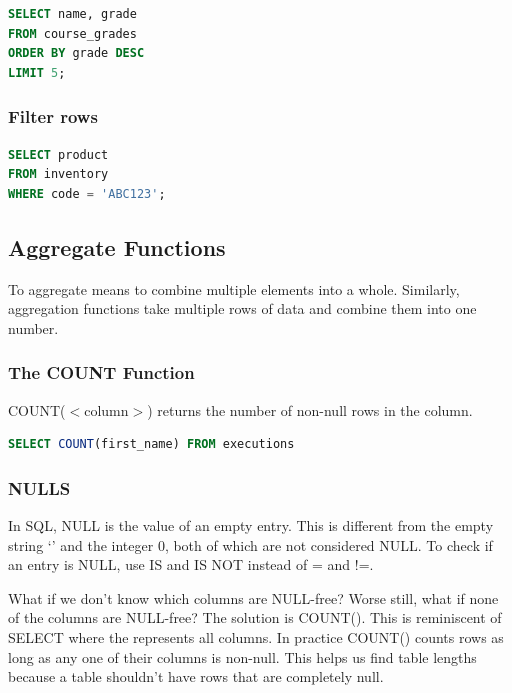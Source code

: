 \documentclass{article}
\begin{document}
\vspace{8pt} \begin{lstlisting}[language=SQL]
SELECT name, grade
FROM course_grades
ORDER BY grade DESC
LIMIT 5;
\end{lstlisting} \vspace{8pt}

\subsubsection{Filter rows}

\vspace{8pt} \begin{lstlisting}[language=SQL]
SELECT product
FROM inventory
WHERE code = 'ABC123';
\end{lstlisting} \vspace{8pt}


\subsection{Aggregate Functions }

To aggregate means to combine multiple elements into a whole. Similarly, aggregation functions take multiple rows of data and combine them into one number.

\subsubsection{The COUNT Function}

COUNT($<$column$>$) returns the number of non-null rows in the column.

\vspace{8pt} \begin{lstlisting}[language=SQL]
SELECT COUNT(first_name) FROM executions
\end{lstlisting} \vspace{8pt}

\subsubsection{NULLS}

In SQL, NULL is the value of an empty entry. This is different from the empty string `' and the integer 0, both of which are not considered NULL. To check if an entry is NULL, use IS and IS NOT instead of = and !=.

What if we don’t know which columns are NULL-free? Worse still, what if none of the columns are NULL-free?  The solution is COUNT(\*). This is reminiscent of SELECT \* where the \* represents all columns. In practice COUNT(\*) counts rows as long as any one of their columns is non-null. This helps us find table lengths because a table shouldn’t have rows that are completely null.
\end{document}
